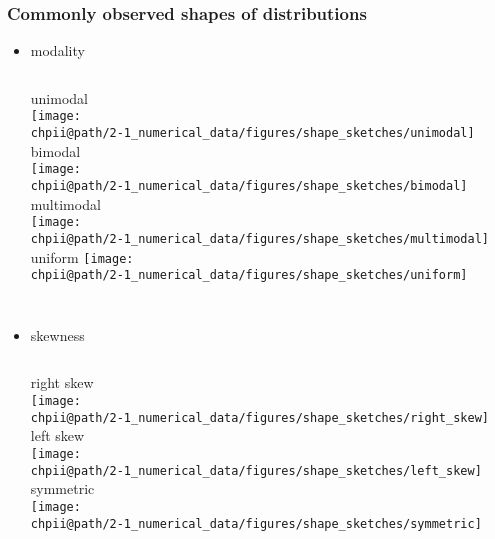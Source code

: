 \documentclass[slidestop,compress,mathserif]{beamer}
\makeatletter
\newcommand{\soln}[1]{\textit{#1}}
\def\chpii@path{../../Chp 2}
\makeatother
\begin{document}





\begin{frame}
\frametitle{Commonly observed shapes of distributions}

\begin{itemize}

\item modality \\
$\:$ \\
\pause

\begin{columns}[c]
unimodal \\
\texttt{[image: \\chpii@path/2-1\_numerical\_data/figures/shape\_sketches/unimodal]} 
\pause
{}
bimodal \\
\texttt{[image: \\chpii@path/2-1\_numerical\_data/figures/shape\_sketches/bimodal]} 
\pause
{}
multimodal \\
\texttt{[image: \\chpii@path/2-1\_numerical\_data/figures/shape\_sketches/multimodal]} 
\pause
{}
uniform
\texttt{[image: \\chpii@path/2-1\_numerical\_data/figures/shape\_sketches/uniform]} 
\end{columns}

\pause

$\:$ \\

\item skewness \\
$\:$ \\
\pause

\begin{columns}[c]
right skew \\
\texttt{[image: \\chpii@path/2-1\_numerical\_data/figures/shape\_sketches/right\_skew]} 
\pause
{}
left skew \\
\texttt{[image: \\chpii@path/2-1\_numerical\_data/figures/shape\_sketches/left\_skew]} 
\pause
{}
symmetric \\
\texttt{[image: \\chpii@path/2-1\_numerical\_data/figures/shape\_sketches/symmetric]} 
\end{columns}

\end{itemize}

\end{frame}
\end{document}

